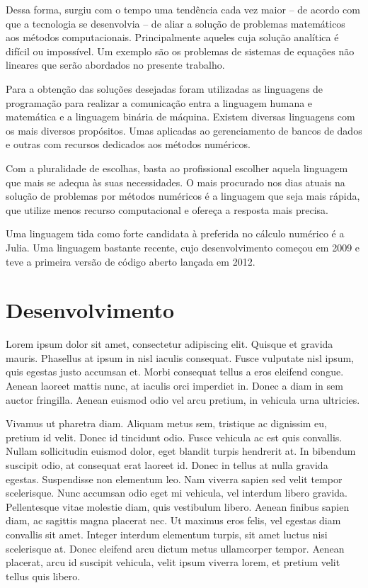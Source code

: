 \documentclass[a4paper, 12pt, openright, oneside]{article}
\begin{document}
Dessa forma, surgiu com o tempo uma tendência cada vez maior -- de acordo com que a tecnologia se desenvolvia -- de aliar a solução de problemas matemáticos aos métodos computacionais. Principalmente aqueles cuja solução analítica é difícil ou impossível. Um exemplo são os problemas de sistemas de equações não lineares que serão abordados no presente trabalho.

Para a obtenção das soluções desejadas foram utilizadas as linguagens de programação para realizar a comunicação entra a linguagem humana e matemática e a linguagem binária de máquina. Existem diversas linguagens com os mais diversos propósitos. Umas aplicadas ao gerenciamento de bancos de dados e outras com recursos dedicados aos métodos numéricos. 

Com a pluralidade de escolhas, basta ao profissional escolher aquela linguagem que mais se adequa às suas necessidades. O mais procurado nos dias atuais na solução de problemas por métodos numéricos é a linguagem que seja mais rápida, que utilize menos recurso computacional e ofereça a resposta mais precisa. 

Uma linguagem tida como forte candidata à preferida no cálculo numérico é a Julia. Uma linguagem bastante recente, cujo desenvolvimento começou em 2009 e teve a primeira versão de código aberto lançada em 2012.


\newpage

\section{Desenvolvimento}

Lorem ipsum dolor sit amet, consectetur adipiscing elit. Quisque et gravida mauris. Phasellus at ipsum in nisl iaculis consequat. Fusce vulputate nisl ipsum, quis egestas justo accumsan et. Morbi consequat tellus a eros eleifend congue. Aenean laoreet mattis nunc, at iaculis orci imperdiet in. Donec a diam in sem auctor fringilla. Aenean euismod odio vel arcu pretium, in vehicula urna ultricies.

Vivamus ut pharetra diam. Aliquam metus sem, tristique ac dignissim eu, pretium id velit. Donec id tincidunt odio. Fusce vehicula ac est quis convallis. Nullam sollicitudin euismod dolor, eget blandit turpis hendrerit at. In bibendum suscipit odio, at consequat erat laoreet id. Donec in tellus at nulla gravida egestas. Suspendisse non elementum leo. Nam viverra sapien sed velit tempor scelerisque. Nunc accumsan odio eget mi vehicula, vel interdum libero gravida. Pellentesque vitae molestie diam, quis vestibulum libero. Aenean finibus sapien diam, ac sagittis magna placerat nec. Ut maximus eros felis, vel egestas diam convallis sit amet. Integer interdum elementum turpis, sit amet luctus nisi scelerisque at. Donec eleifend arcu dictum metus ullamcorper tempor. Aenean placerat, arcu id suscipit vehicula, velit ipsum viverra lorem, et pretium velit tellus quis libero.
\end{document}
